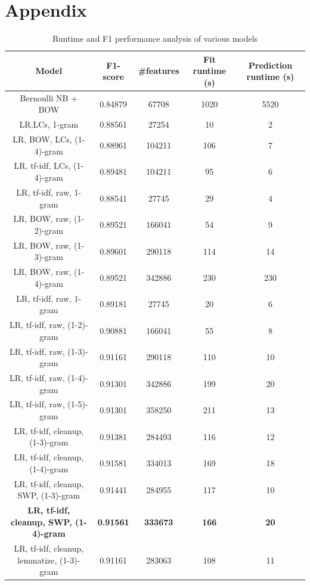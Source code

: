 \documentclass{amsart}
\theoremstyle{definition}
\theoremstyle{remark}
\numberwithin{equation}{section}
\begin{document}
\section{Appendix}
\begin{center}
	\begin{table}
		\caption{Runtime and F1 performance analysis of various models} \label{tab:title}
		\begin{tabular}{|| c | c | c | c | c ||}
			\hline
			Model & F1-score & \#features & Fit runtime (s) & Prediction runtime (s) \\
			\hline\hline
			Bernoulli NB + BOW & 0.84879 & 67708 & 1020 & 5520 \\
			\hline
			LR,LCs, 1-gram & 0.88561 & 27254 & 10 & 2 \\
			\hline
			LR, BOW, LCs, (1-4)-gram &  0.88961 & 104211 & 106 & 7 \\
			\hline
			LR, tf-idf, LCs, (1-4)-gram & 0.89481 & 104211 & 95 & 6 \\
			\hline
			LR, tf-idf, raw, 1-gram & 0.88541 & 27745 & 29 & 4 \\
			\hline
			LR, BOW, raw, (1-2)-gram & 0.89521 & 166041 & 54 & 9 \\
			\hline
			LR, BOW, raw, (1-3)-gram & 0.89601 & 290118 & 114 & 14 \\
			\hline
			LR, BOW, raw, (1-4)-gram & 0.89521 & 342886 & 230 & 230 \\
			\hline
			LR, tf-idf, raw, 1-gram & 0.89181 & 27745 & 20 & 6 \\
			\hline
			LR, tf-idf, raw, (1-2)-gram & 0.90881 & 166041 & 55 & 8 \\
			\hline
			LR, tf-idf, raw, (1-3)-gram & 0.91161 & 290118 & 110 & 10 \\
			\hline
			LR, tf-idf, raw, (1-4)-gram & 0.91301 & 342886 & 199 & 20 \\
			\hline
			LR, tf-idf, raw, (1-5)-gram & 0.91301 & 358250 & 211 & 13 \\
			\hline
			LR, tf-idf, cleanup, (1-3)-gram & 0.91381 & 284493 & 116 & 12 \\
			\hline
			LR, tf-idf, cleanup, (1-4)-gram & 0.91581 & 334013 & 169 & 18\\
			\hline
			LR, tf-idf, cleanup, SWP, (1-3)-gram & 0.91441 & 284955 & 117 & 10 \\
			\hline
			\textbf{LR, tf-idf, cleanup, SWP, (1-4)-gram} & \textbf{0.91561} & \textbf{333673} & \textbf{166} & \textbf{20} \\
			\hline
			LR, tf-idf, cleanup, lemmatize, (1-3)-gram & 0.91161 & 283063 & 108 & 11\\

\end{tabular}
\end{table}
\end{center}
\end{document}
